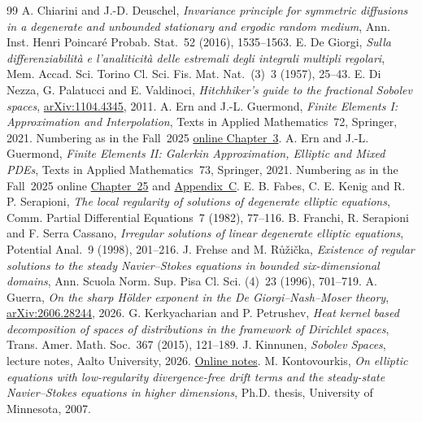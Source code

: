 \documentclass[11pt,letterpaper]{article}
\numberwithin{equation}{section}
\theoremstyle{definition}
\begin{document}
\begin{thebibliography}{99}
A. Chiarini and J.-D. Deuschel, \emph{Invariance principle for symmetric diffusions in a degenerate and unbounded stationary and ergodic random medium}, Ann. Inst. Henri Poincar\'e Probab. Stat.~52 (2016), 1535--1563.
E. De Giorgi, \emph{Sulla differenziabilit\`a e l'analiticit\`a delle estremali degli integrali multipli regolari}, Mem. Accad. Sci. Torino Cl. Sci. Fis. Mat. Nat.~(3)~3 (1957), 25--43.
E. Di Nezza, G. Palatucci and E. Valdinoci, \emph{Hitchhiker's guide to the fractional Sobolev spaces}, \href{https://arxiv.org/abs/1104.4345}{arXiv:1104.4345}, 2011.
A. Ern and J.-L. Guermond, \emph{Finite Elements I: Approximation and Interpolation}, Texts in Applied Mathematics~72, Springer, 2021. Numbering as in the Fall~2025 \href{https://people.tamu.edu/~guermond/M661_FALL_2025/chap03.pdf}{online Chapter~3}.
A. Ern and J.-L. Guermond, \emph{Finite Elements II: Galerkin Approximation, Elliptic and Mixed PDEs}, Texts in Applied Mathematics~73, Springer, 2021. Numbering as in the Fall~2025 online \href{https://people.tamu.edu/~guermond/M661_FALL_2025/chap25.pdf}{Chapter~25} and \href{https://people.tamu.edu/~guermond/M661_FALL_2025/App_C_and_ref.pdf}{Appendix~C}.
E. B. Fabes, C. E. Kenig and R. P. Serapioni, \emph{The local regularity of solutions of degenerate elliptic equations}, Comm. Partial Differential Equations~7 (1982), 77--116.
B. Franchi, R. Serapioni and F. Serra Cassano, \emph{Irregular solutions of linear degenerate elliptic equations}, Potential Anal.~9 (1998), 201--216.
J. Frehse and M. R\r{u}\v{z}i\v{c}ka, \emph{Existence of regular solutions to the steady Navier--Stokes equations in bounded six-dimensional domains}, Ann. Scuola Norm. Sup. Pisa Cl. Sci. (4)~23 (1996), 701--719.
A. Guerra, \emph{On the sharp H\"older exponent in the De Giorgi--Nash--Moser theory}, \href{https://arxiv.org/abs/2606.28244}{arXiv:2606.28244}, 2026.
G. Kerkyacharian and P. Petrushev, \emph{Heat kernel based decomposition of spaces of distributions in the framework of Dirichlet spaces}, Trans. Amer. Math. Soc.~367 (2015), 121--189.
J. Kinnunen, \emph{Sobolev Spaces}, lecture notes, Aalto University, 2026. \href{https://math.aalto.fi/~jkkinnun/files/sobolev_spaces.pdf}{Online notes}.
M. Kontovourkis, \emph{On elliptic equations with low-regularity divergence-free drift terms and the steady-state Navier--Stokes equations in higher dimensions}, Ph.D. thesis, University of Minnesota, 2007.

\end{thebibliography}
\end{document}
